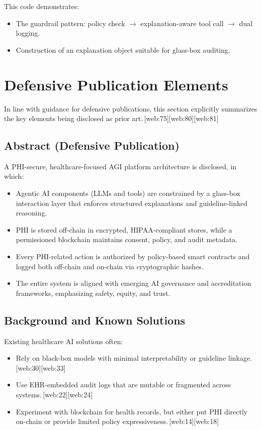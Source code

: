 \documentclass[11pt]{article}
\begin{document}
This code demonstrates:
\begin{itemize}[nosep]
  \item The guardrail pattern: policy check $\rightarrow$ explanation-aware tool call $\rightarrow$ dual logging.
  \item Construction of an explanation object suitable for glass-box auditing.
\end{itemize}

\section{Defensive Publication Elements}

In line with guidance for defensive publications, this section explicitly summarizes the key elements being disclosed as prior art.\,[web:75][web:80][web:81]

\subsection{Abstract (Defensive Publication)}

A PHI-secure, healthcare-focused AGI platform architecture is disclosed, in which:
\begin{itemize}[nosep]
  \item Agentic AI components (LLMs and tools) are constrained by a glass-box interaction layer that enforces structured explanations and guideline-linked reasoning.
  \item PHI is stored off-chain in encrypted, HIPAA-compliant stores, while a permissioned blockchain maintains consent, policy, and audit metadata.
  \item Every PHI-related action is authorized by policy-based smart contracts and logged both off-chain and on-chain via cryptographic hashes.
  \item The entire system is aligned with emerging AI governance and accreditation frameworks, emphasizing safety, equity, and trust.
\end{itemize}

\subsection{Background and Known Solutions}

Existing healthcare AI solutions often:
\begin{itemize}[nosep]
  \item Rely on black-box models with minimal interpretability or guideline linkage.\,[web:30][web:33]
  \item Use EHR-embedded audit logs that are mutable or fragmented across systems.\,[web:22][web:24]
  \item Experiment with blockchain for health records, but either put PHI directly on-chain or provide limited policy expressiveness.\,[web:14][web:18]
\end{itemize}
\end{document}
